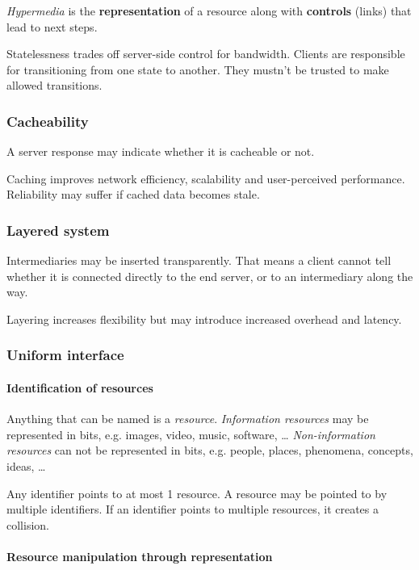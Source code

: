 \documentclass{report}
\begin{document}
\emph{Hypermedia} is the \textbf{representation} of a resource
along with \textbf{controls} (links) that lead to next steps.

Statelessness trades off server-side control for bandwidth.
Clients are responsible for transitioning from one state to another.
They mustn't be trusted to make allowed transitions.

\subsubsection{Cacheability}

A server response may indicate whether it is cacheable or not.

Caching improves network efficiency, scalability
and user-perceived performance.
Reliability may suffer if cached data becomes stale.

\subsubsection{Layered system}

Intermediaries may be inserted transparently.
That means a client cannot tell whether it is connected
directly to the end server, or to an intermediary along the way.

Layering increases flexibility
but may introduce increased overhead and latency.

\subsubsection{Uniform interface}

\paragraph{Identification of resources}

Anything that can be named is a \emph{resource}.
\emph{Information resources} may be represented in bits,
e.g. images, video, music, software, \dots
\emph{Non-information resources} can not be represented in bits,
e.g. people, places, phenomena, concepts, ideas, \dots

Any identifier points to at most 1 resource.
A resource may be pointed to by multiple identifiers.
If an identifier points to multiple resources,
it creates a collision.

\paragraph{Resource manipulation through representation}
\end{document}
